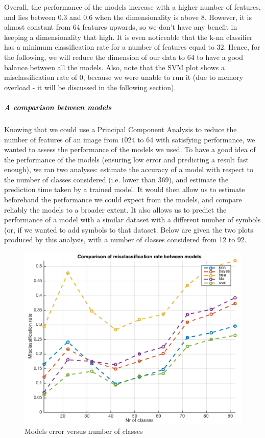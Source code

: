 \documentclass[twocolumn]{article}%
\begin{document}
	Overall, the performance of the models increase with a higher number of features, and lies between $0.3$ and $0.6$ when the dimensionality is above $8$. However, it is almost constant from 64 features upwards, so we don't have any benefit in keeping a dimensionality that high. It is even noticeable that the k-nn classifier has a minimum classification rate for a number of features equal to 32. Hence, for the following, we will reduce the dimension of our data to 64 to have a good balance between all the models. Also, note that the SVM plot shows a misclassification rate of 0, because we were unable to run it (due to memory overload - it will be discussed in the following section).
	
	
	\subparagraph{A comparison between models}
	Knowing that we could use a Principal Component Analysis to reduce the number of features of an image from $1024$ to $64$ with satisfying performance, we wanted to assess the performance of the models we used. To have a good idea of the performance of the models (ensuring low error and predicting a result fast enough), we ran two analyses: estimate the accuracy of a model with respect to the number of classes considered (i.e. lower than 369), and estimate the prediction time taken by a trained model. It would then allow us to estimate beforehand the performance we could expect from the models, and compare reliably the models to a broader extent. It also allows us to predict the performance of a model with a similar dataset with a different number of symbols (or, if we wanted to add symbols to that dataset. Below are given the two plots produced by this analysis, with a number of classes considered from 12 to 92.
	
	\begin{figure}[h!]
	\centering
	\includegraphics[scale=0.45]{images/error_vs_nclasses.png}
	\caption{Models error versus number of classes}
	\label{errorVSnClasses}
	\end{figure}
	
\end{document}

